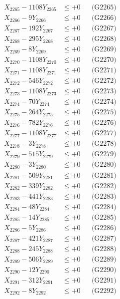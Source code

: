 \documentclass[a4paper,10pt]{article}
\begin{document}
{\begin{align}
X_{2265} - 1108Y_{2265} &\leq +0 && \text{(G2265)} \\
X_{2266} - 9Y_{2266} &\leq +0 && \text{(G2266)} \\
X_{2267} - 192Y_{2267} &\leq +0 && \text{(G2267)} \\
X_{2268} - 295Y_{2268} &\leq +0 && \text{(G2268)} \\
X_{2269} - 8Y_{2269} &\leq +0 && \text{(G2269)} \\
X_{2270} - 1108Y_{2270} &\leq +0 && \text{(G2270)} \\
\allowbreak
X_{2271} - 1108Y_{2271} &\leq +0 && \text{(G2271)} \\
X_{2272} - 546Y_{2272} &\leq +0 && \text{(G2272)} \\
X_{2273} - 1108Y_{2273} &\leq +0 && \text{(G2273)} \\
X_{2274} - 70Y_{2274} &\leq +0 && \text{(G2274)} \\
X_{2275} - 264Y_{2275} &\leq +0 && \text{(G2275)} \\
X_{2276} - 782Y_{2276} &\leq +0 && \text{(G2276)} \\
X_{2277} - 1108Y_{2277} &\leq +0 && \text{(G2277)} \\
X_{2278} - 3Y_{2278} &\leq +0 && \text{(G2278)} \\
X_{2279} - 515Y_{2279} &\leq +0 && \text{(G2279)} \\
X_{2280} - 3Y_{2280} &\leq +0 && \text{(G2280)} \\
\allowbreak
X_{2281} - 509Y_{2281} &\leq +0 && \text{(G2281)} \\
X_{2282} - 339Y_{2282} &\leq +0 && \text{(G2282)} \\
X_{2283} - 441Y_{2283} &\leq +0 && \text{(G2283)} \\
X_{2284} - 48Y_{2284} &\leq +0 && \text{(G2284)} \\
X_{2285} - 14Y_{2285} &\leq +0 && \text{(G2285)} \\
X_{2286} - 5Y_{2286} &\leq +0 && \text{(G2286)} \\
X_{2287} - 421Y_{2287} &\leq +0 && \text{(G2287)} \\
X_{2288} - 245Y_{2288} &\leq +0 && \text{(G2288)} \\
X_{2289} - 506Y_{2289} &\leq +0 && \text{(G2289)} \\
X_{2290} - 12Y_{2290} &\leq +0 && \text{(G2290)} \\
\allowbreak
X_{2291} - 312Y_{2291} &\leq +0 && \text{(G2291)} \\
X_{2292} - 8Y_{2292} &\leq +0 && \text{(G2292)} \\

\end{align}}
\end{document}
